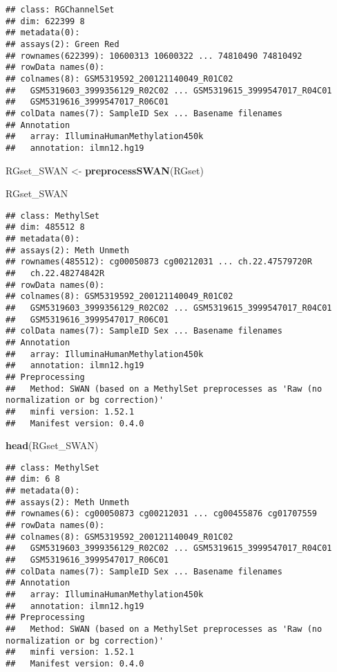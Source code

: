 \documentclass[
]{article}
\newenvironment{Shaded}{\begin{snugshade}}{\end{snugshade}}
\newcommand{\FunctionTok}[1]{\textcolor[rgb]{0.13,0.29,0.53}{\textbf{#1}}}
\newcommand{\NormalTok}[1]{#1}
\newcommand{\OtherTok}[1]{\textcolor[rgb]{0.56,0.35,0.01}{#1}}
\begin{document}
\begin{verbatim}
## class: RGChannelSet 
## dim: 622399 8 
## metadata(0):
## assays(2): Green Red
## rownames(622399): 10600313 10600322 ... 74810490 74810492
## rowData names(0):
## colnames(8): GSM5319592_200121140049_R01C02
##   GSM5319603_3999356129_R02C02 ... GSM5319615_3999547017_R04C01
##   GSM5319616_3999547017_R06C01
## colData names(7): SampleID Sex ... Basename filenames
## Annotation
##   array: IlluminaHumanMethylation450k
##   annotation: ilmn12.hg19
\end{verbatim}

\begin{Shaded}
\begin{Highlighting}[]
\NormalTok{RGset\_SWAN }\OtherTok{\textless{}{-}} \FunctionTok{preprocessSWAN}\NormalTok{(RGset)}

\NormalTok{RGset\_SWAN}
\end{Highlighting}
\end{Shaded}

\begin{verbatim}
## class: MethylSet 
## dim: 485512 8 
## metadata(0):
## assays(2): Meth Unmeth
## rownames(485512): cg00050873 cg00212031 ... ch.22.47579720R
##   ch.22.48274842R
## rowData names(0):
## colnames(8): GSM5319592_200121140049_R01C02
##   GSM5319603_3999356129_R02C02 ... GSM5319615_3999547017_R04C01
##   GSM5319616_3999547017_R06C01
## colData names(7): SampleID Sex ... Basename filenames
## Annotation
##   array: IlluminaHumanMethylation450k
##   annotation: ilmn12.hg19
## Preprocessing
##   Method: SWAN (based on a MethylSet preprocesses as 'Raw (no normalization or bg correction)'
##   minfi version: 1.52.1
##   Manifest version: 0.4.0
\end{verbatim}

\begin{Shaded}
\begin{Highlighting}[]
\FunctionTok{head}\NormalTok{(RGset\_SWAN)}
\end{Highlighting}
\end{Shaded}

\begin{verbatim}
## class: MethylSet 
## dim: 6 8 
## metadata(0):
## assays(2): Meth Unmeth
## rownames(6): cg00050873 cg00212031 ... cg00455876 cg01707559
## rowData names(0):
## colnames(8): GSM5319592_200121140049_R01C02
##   GSM5319603_3999356129_R02C02 ... GSM5319615_3999547017_R04C01
##   GSM5319616_3999547017_R06C01
## colData names(7): SampleID Sex ... Basename filenames
## Annotation
##   array: IlluminaHumanMethylation450k
##   annotation: ilmn12.hg19
## Preprocessing
##   Method: SWAN (based on a MethylSet preprocesses as 'Raw (no normalization or bg correction)'
##   minfi version: 1.52.1
##   Manifest version: 0.4.0
\end{verbatim}
\end{document}
